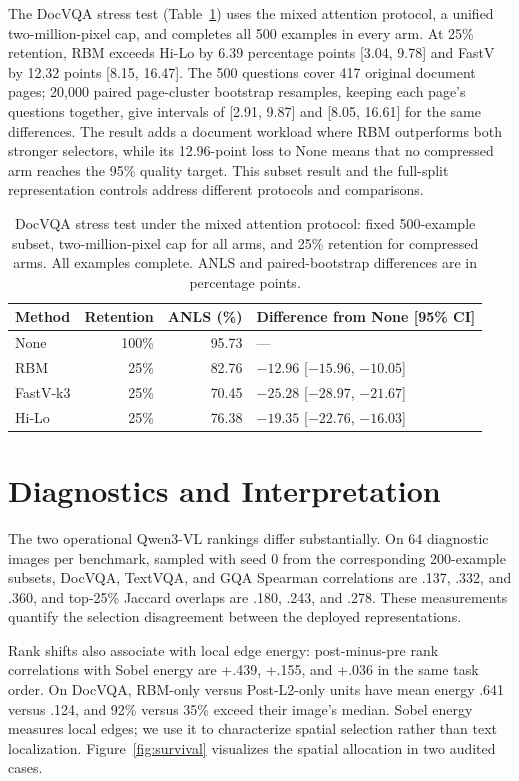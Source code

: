 \documentclass[10pt,twocolumn,letterpaper]{article}
\begin{document}
The DocVQA stress test (Table~\ref{tab:docstress}) uses the mixed attention protocol, a unified two-million-pixel cap, and completes all 500 examples in every arm. At 25\% retention, RBM exceeds Hi-Lo by 6.39 percentage points [3.04, 9.78] and FastV by 12.32 points [8.15, 16.47]. The 500 questions cover 417 original document pages; 20,000 paired page-cluster bootstrap resamples, keeping each page's questions together, give intervals of [2.91, 9.87] and [8.05, 16.61] for the same differences. The result adds a document workload where RBM outperforms both stronger selectors, while its 12.96-point loss to None means that no compressed arm reaches the 95\% quality target. This subset result and the full-split representation controls address different protocols and comparisons.

\begin{table}[t]
\centering
\caption{\label{tab:docstress}DocVQA stress test under the mixed attention protocol: fixed 500-example subset, two-million-pixel cap for all arms, and 25\% retention for compressed arms. All examples complete. ANLS and paired-bootstrap differences are in percentage points.}
\small
\begin{tabular}{lrrl}
\toprule
Method & Retention & ANLS (\%) & Difference from None [95\% CI]\\
\midrule
None & 100\% & 95.73 & ---\\
RBM & 25\% & 82.76 & $-12.96$ [$-15.96$, $-10.05$]\\
FastV-k3 & 25\% & 70.45 & $-25.28$ [$-28.97$, $-21.67$]\\
Hi-Lo & 25\% & 76.38 & $-19.35$ [$-22.76$, $-16.03$]\\
\bottomrule
\end{tabular}
\end{table}

\section{Diagnostics and Interpretation}
The two operational Qwen3-VL rankings differ substantially. On 64 diagnostic images per benchmark, sampled with seed 0 from the corresponding 200-example subsets, DocVQA, TextVQA, and GQA Spearman correlations are .137, .332, and .360, and top-25\% Jaccard overlaps are .180, .243, and .278. These measurements quantify the selection disagreement between the deployed representations.

Rank shifts also associate with local edge energy: post-minus-pre rank correlations with Sobel energy are +.439, +.155, and +.036 in the same task order. On DocVQA, RBM-only versus Post-L2-only units have mean energy .641 versus .124, and 92\% versus 35\% exceed their image's median. Sobel energy measures local edges; we use it to characterize spatial selection rather than text localization. Figure~\ref{fig:survival} visualizes the spatial allocation in two audited cases.
\end{document}
